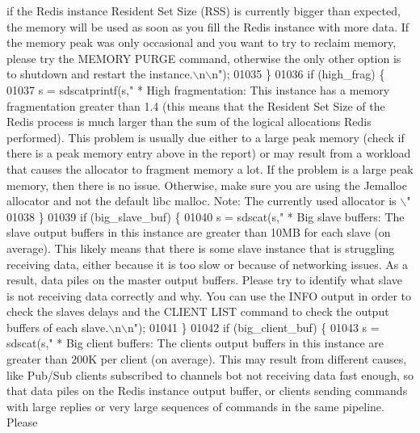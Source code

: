 \begin{DoxyCode}
{{{       if the Redis instance Resident Set Size (RSS) is currently bigger than expected, the memory will be used as
       soon as you fill the Redis instance with more data. If the memory peak was only occasional and you want to
       try to reclaim memory, please try the MEMORY PURGE command, otherwise the only other option is to shutdown and
       restart the instance.\(\backslash\)n\(\backslash\)n"});
01035         \}
01036         \textcolor{keywordflow}{if} (high\_frag) \{
01037             s = sdscatprintf(s,\textcolor{stringliteral}{" * High fragmentation: This instance has a memory fragmentation
       greater than 1.4 (this means that the Resident Set Size of the Redis process is much larger than the sum of the
       logical allocations Redis performed). This problem is usually due either to a large peak memory (check if
       there is a peak memory entry above in the report) or may result from a workload that causes the allocator to
       fragment memory a lot. If the problem is a large peak memory, then there is no issue. Otherwise, make sure you
       are using the Jemalloc allocator and not the default libc malloc. Note: The currently used allocator is
       \(\backslash\)"%
01038         \}
01039         \textcolor{keywordflow}{if} (big\_slave\_buf) \{
01040             s = sdscat(s,\textcolor{stringliteral}{" * Big slave buffers: The slave output buffers in this instance are greater
       than 10MB for each slave (on average). This likely means that there is some slave instance that is
       struggling receiving data, either because it is too slow or because of networking issues. As a result, data piles on
       the master output buffers. Please try to identify what slave is not receiving data correctly and why. You
       can use the INFO output in order to check the slaves delays and the CLIENT LIST command to check the output
       buffers of each slave.\(\backslash\)n\(\backslash\)n"});
01041         \}
01042         \textcolor{keywordflow}{if} (big\_client\_buf) \{
01043             s = sdscat(s,\textcolor{stringliteral}{" * Big client buffers: The clients output buffers in this instance are
       greater than 200K per client (on average). This may result from different causes, like Pub/Sub clients subscribed
       to channels bot not receiving data fast enough, so that data piles on the Redis instance output buffer, or
       clients sending commands with large replies or very large sequences of commands in the same pipeline. Please
}}}}
\end{DoxyCode}
